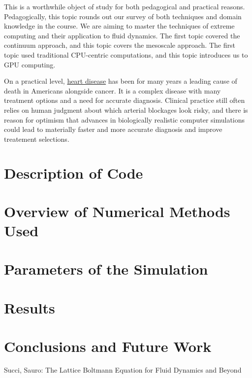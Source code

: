 \documentclass[11pt]{article} %
\begin{document}
This is a worthwhile object of study for both pedagogical and practical reasons.
Pedagogically, this topic rounds out our survey of both techniques and domain knowledge in the course.
We are aiming to master the techniques of extreme computing and their application to fluid dynamics.
The first topic covered the continuum approach, and this topic covers the mesoscale approach.
The first topic used traditional CPU-centric computations, and this topic introduces us to GPU computing.

On a practical level, \href{https://www.cdc.gov/heartdisease/facts.htm}{heart disease} 
has been for many years a leading cause of death in Americans alongside cancer.
It is a complex disease with many treatment options and a need for accurate diagnosis.
Clinical practice still often relies on human judgment about which arterial blockages 
look risky, and there is reason for optimism that advances in biologically realistic computer
simulations could lead to materially faster and more accurate diagnosis 
and improve treatement selections.

\section{Description of Code}

\section{Overview of Numerical Methods Used}

\section{Parameters of the Simulation}

\section{Results}

\section{Conclusions and Future Work}


\begin{thebibliography}{9}
Succi, Sauro: The Lattice Boltmann Equation for Fluid Dynamics and Beyond

\end{thebibliography}
\end{document}
